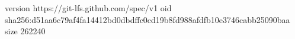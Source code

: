 version https://git-lfs.github.com/spec/v1
oid sha256:d51aa6c79af4fa14412bd0dbdffc0cd19b8fd988afdfb10e3746cabb25090baa
size 262240
